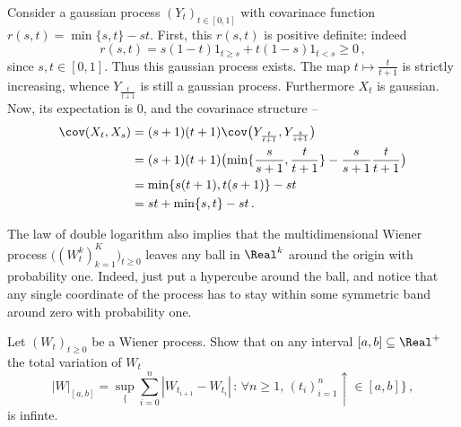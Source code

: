Consider a gaussian process $(Y_t)_{t\in [0,1]}$ with covarinace function
$r(s,t) = \min\{s,t\}-s t$. First, this $r(s,t)$ is positive definite: indeed
\[ r(s,t) = s(1-t)1_{t\geq s} + t(1-s)1_{t<s} \geq 0\,, \]
since $s,t\in[0,1]$. Thus this gaussian process exists.
The map $t\mapsto \frac{t}{t+1}$ is strictly increasing, whence $Y_\frac{t}{t+1}$
is still a gaussian process. Furthermore $X_t$ is gaussian. Now, its expectation
is $0$, and the covarinace structure -- 
\begin{align*}
	\cov(X_t, X_s) &= (s+1)(t+1) \cov\bigl(Y_\frac{t}{t+1}, Y_\frac{s}{s+1}\bigr) \\
		&= (s+1)(t+1)\bigl( \min\{\frac{s}{s+1},\frac{t}{t+1}\}-\frac{s}{s+1} \frac{t}{t+1} \bigr)\\
		&= \min\{s(t+1),t(s+1)\} - st \\
		&= st + \min\{s,t\} - st \,.
\end{align*}

The law of double logarithm also implies that the multidimensional Wiener process
$\bigl((W^k_t)_{k=1}^K\bigr)_{t\geq0}$ leaves any ball in $\Real^k$ around the
origin with probability one. Indeed, just put a hypercube around the ball, and notice
that any single coordinate of the process has to stay within some symmetric band
around zero with probability one.

Let $(W_t)_{t\geq 0}$ be a Wiener process. Show that on any interval $[a,b]\subseteq \Real^+$
the total variation of $W_t$
\[ |W|_{[a,b]} = \sup_\bigl\{ \sum_{i=0}^n |W_{t_{i+1}}-W_{t_i}|\,:\,
							  \forall n\geq 1,\,(t_i)_{i=1}^n\uparrow\in [a,b] \bigr\}
	\,, \]
is infinte.

